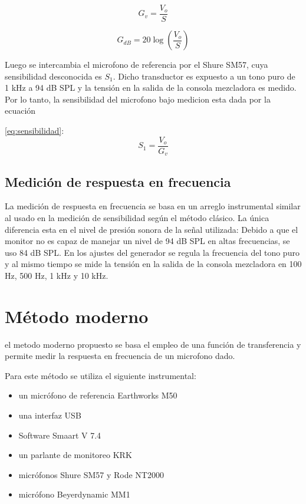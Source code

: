 \documentclass[]{article}
\begin{document}
\begin{multicols}{2}
\begin{equation}
  G_v=\frac{V_o}{S}
  \label{eq:g-veces}
\end{equation}

\begin{equation}
  G_{dB}= 20 \log \left(\frac{V_o}{S}\right)
  \label{eq:g-dB}
\end{equation}

Luego se intercambia el microfono de referencia por el Shure SM57, cuya
sensibilidad desconocida es $S_1$. Dicho transductor es expuesto a un tono puro
de 1 kHz a 94 dB SPL y la tensión en la salida de la consola mezcladora es medido.
Por lo tanto, la sensibilidad del microfono bajo medicion esta dada por la ecuación

\ref{eq:sensibilidad}:
\begin{equation}
  S_1=\frac{V_o}{G_v}
  \label{eq:sensibilidad}
\end{equation}

\subsection{Medición de respuesta en frecuencia}
La medición de respuesta en frecuencia se basa en un arreglo instrumental
similar al usado en la medición de sensibilidad según el método clásico.
La única diferencia esta en el nivel de presión sonora de la señal utilizada: Debido
a que el monitor no es capaz de manejar un nivel de 94 dB SPL en altas
frecuencias, se uso 84 dB SPL.
En los ajustes del generador se regula la frecuencia del tono puro y al mismo
tiempo se mide la tensión en la salida de la consola mezcladora en 100 Hz, 500 Hz,
1 kHz y 10 kHz.

\section{Método moderno}
el metodo moderno propuesto se basa el empleo de una función de transferencia
\cite{smaart} y permite medir la respuesta en frecuencia de un microfono dado.

Para este método se utiliza el siguiente instrumental:

\begin{itemize}
\item un micrófono de referencia Earthworks M50
\item una interfaz USB
\item Software Smaart V 7.4
\item un parlante de monitoreo KRK
\item micrófonos Shure SM57 y Rode NT2000
\item micrófono Beyerdynamic MM1
\end{itemize}


\end{multicols}
\end{document}
